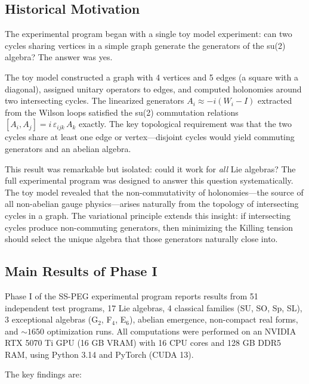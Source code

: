 \subsection{Historical Motivation}\label{sec:history}

The experimental program began with a single toy model experiment: can two cycles sharing vertices in a simple graph generate the generators of the su(2) algebra? The answer was yes.

The toy model constructed a graph with 4 vertices and 5 edges (a square with a diagonal), assigned unitary operators to edges, and computed holonomies around two intersecting cycles. The linearized generators $A_i \approx -i(W_i - I)$ extracted from the Wilson loops satisfied the su(2) commutation relations $[A_i, A_j] = i\,\varepsilon_{ijk}\,A_k$ exactly. The key topological requirement was that the two cycles share at least one edge or vertex---disjoint cycles would yield commuting generators and an abelian algebra.

This result was remarkable but isolated: could it work for \textit{all} Lie algebras? The full experimental program was designed to answer this question systematically. The toy model revealed that the non-commutativity of holonomies---the source of all non-abelian gauge physics---arises naturally from the topology of intersecting cycles in a graph. The variational principle extends this insight: if intersecting cycles produce non-commuting generators, then minimizing the Killing tension should select the unique algebra that those generators naturally close into.

\subsection{Main Results of Phase I}\label{sec:results}

Phase I of the SS-PEG experimental program reports results from 51 independent test programs, 17 Lie algebras, 4 classical families (SU, SO, Sp, SL), 3 exceptional algebras (G$_2$, F$_4$, E$_6$), abelian emergence, non-compact real forms, and $\sim 1650$ optimization runs. All computations were performed on an NVIDIA RTX 5070 Ti GPU (16 GB VRAM) with 16 CPU cores and 128 GB DDR5 RAM, using Python 3.14 and PyTorch (CUDA 13).

The key findings are:

